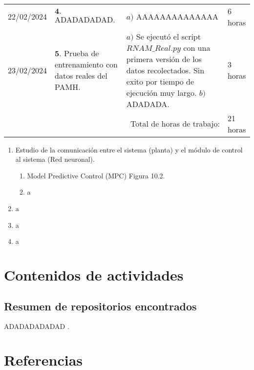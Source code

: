 \documentclass[12pt]{article}
\begin{document}
\hfill\\
\begin{minipage}[h]{\textwidth}
	\centering
	\begin{tabularx}{\textwidth}{|p{2cm}|X|X|p{2cm}|} 
		\hline		
		
	 	22/02/2024 & 
	 	$\mathbf{4}.$ ADADADADAD. & 
	 	$a)$ AAAAAAAAAAAAAA \newline  & 
	 	6 horas \\
	 	23/02/2024 & 
	 	$\mathbf{5}.$ Prueba de entrenamiento con datos reales del PAMH. & 
	 	$a)$ Se ejecutó el script $RNAM\_Real.py$ con una primera versión de los datos recolectados. Sin exito por tiempo de ejecución muy largo. \newline 
	 	$b)$ ADADADA. \newline & 
	 	3 horas \\
	 	\hline
		\multicolumn{3}{|r|}{Total de horas de trabajo:} & 21 horas \\ 
	 	\hline                 
	\end{tabularx}
\end{minipage}


\begin{enumerate}
	\item Estudio de la comunicación entre el sistema (planta) y el módulo de control al sistema (Red neuronal).
	\begin{enumerate}
		\item Model Predictive Control (MPC) \cite{DataScience} Figura 10.2.
		\item a
	\end{enumerate}
	\item a
	\item a
	\item a
\end{enumerate}


\newpage

\section*{Contenidos de actividades}

\subsection*{Resumen de repositorios encontrados}

ADADADADADAD \cite{DataScience}.






\newpage

\section*{Referencias}
\renewcommand\refname{}


\end{document}
